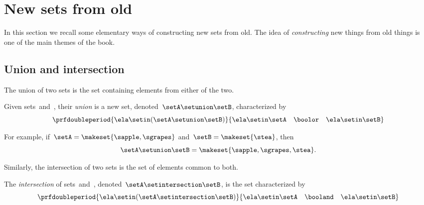 
\section{New sets from old}

In this section we recall some elementary ways of constructing new sets from old.
%
The idea of \emph{constructing} new things from old things is one of the main themes of the book.

\subsection{Union and intersection}
The union of two sets is the set containing elements from either of the two.
\begin{ctdefinition}
    \label{def:union-of-sets}
    Given sets~\setA and~\setB, their \emph{union} is a new set, denoted~$\setA \setunion \setB$, characterized by
    \begin{equation}
        \prfdoubleperiod{
            \ela \setin(\setA \setunion \setB)
        }{
            \ela \setin\setA \quad \boolor \quad  \ela \setin\setB
        }
    \end{equation}
\end{ctdefinition}

For example, if~$\setA = \makeset{ \sapple, \sgrapes }$ and~$\setB = \makeset{ \stea }$, then
\begin{equation}
    \setA \setunion \setB = \makeset{ \sapple, \sgrapes, \stea }.
\end{equation}


Similarly, the intersection of two sets is the set of elements common to both.

\begin{ctdefinition}
    \label{def:intersection-of-sets}
    The \emph{intersection} of sets~\setA and~\setB, denoted~$\setA \setintersection \setB$, is the set characterized by
    \begin{equation}
        \prfdoubleperiod{
            \ela \setin(\setA \setintersection \setB)
        }{
            \ela \setin\setA \quad \booland \quad \ela \setin\setB
        }
    \end{equation}
\end{ctdefinition}

